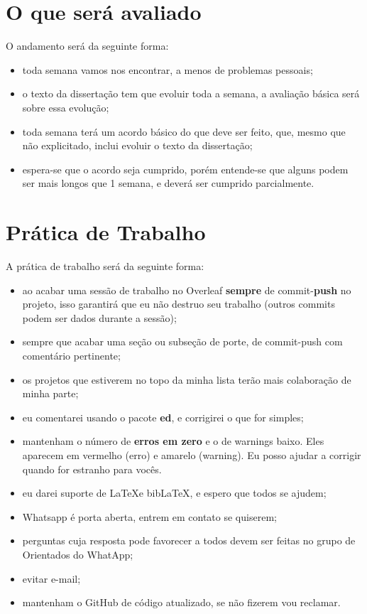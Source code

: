 \documentclass{article}
\begin{document}
\section{O que será avaliado}

O andamento será da seguinte forma:
\begin{itemize}
    \item toda semana vamos nos encontrar, a menos de problemas pessoais;
    \item o texto da dissertação tem que evoluir toda a semana, a avaliação básica será sobre essa evolução;
    \item toda semana terá um acordo básico do que deve ser feito, que, mesmo que não explicitado, inclui evoluir o texto da dissertação;
    \item espera-se que o acordo seja cumprido, porém entende-se que alguns podem ser mais longos que 1 semana, e deverá ser cumprido parcialmente.
\end{itemize}

\section{Prática de Trabalho}

A prática de trabalho será da seguinte forma:

\begin{itemize}
    \item ao acabar uma sessão de trabalho no Overleaf \textbf{sempre} de commit-\textbf{push} no projeto, isso garantirá que eu não destruo seu trabalho (outros commits podem ser dados durante a sessão);
    \item sempre que acabar uma seção ou subseção de porte, de commit-push com comentário pertinente;
    \item os projetos que estiverem no topo da minha lista terão mais colaboração de minha parte;
    \item eu comentarei usando o pacote \textbf{ed}, e corrigirei o que for simples;
    \item mantenham o número de \textbf{erros em zero} e o de warnings baixo. Eles aparecem em vermelho (erro) e amarelo (warning). Eu posso ajudar a corrigir quando for estranho para vocês.
    \item eu darei suporte de \LaTeX e bib\LaTeX, e espero que todos se ajudem;
    \item Whatsapp é porta aberta, entrem em contato se quiserem;
    \item perguntas cuja resposta pode favorecer a todos devem ser feitas no grupo de Orientados do WhatApp;
    \item evitar e-mail;
    \item mantenham o GitHub de código atualizado, se não fizerem vou reclamar.
\end{itemize}
\end{document}
